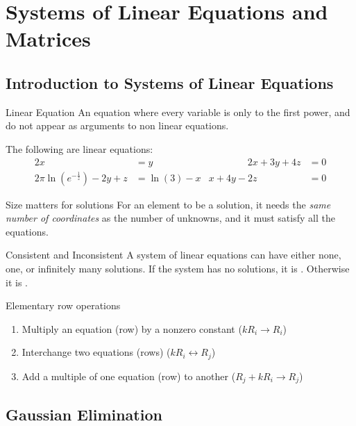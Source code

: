 \documentclass[\main/notes.tex]{subfiles}
\begin{document}
	\chapter[Linear Equations and Matrices]{Systems of Linear Equations and Matrices}
		\section{Introduction to Systems of Linear Equations}
			\begin{definition}{Linear Equation}
				An equation where every variable is only to the first power, and do not appear as arguments to non linear equations.

				\begin{example}
					The following are linear equations:
					\begin{alignat*}{2}
						x &= y & \qquad \qquad 2x + 3y + 4z &= 0\\
						2 \pi \ln \left(e^{-\frac{1}{z}}\right) - 2y + z &= \ln(3) - x & x + 4y - 2z &= 0
					\end{alignat*}
				\end{example}
			\end{definition}
			\begin{sidenote}{Size matters for solutions}
				For an element to be a solution, it needs the \emph{same number of coordinates} as the number of unknowns, and it must satisfy all the equations.
			\end{sidenote}
			\begin{definition}{Consistent and Inconsistent}
				A system of linear equations can have either none, one, or infinitely many solutions. If the system has no solutions, it is . Otherwise it is .
			\end{definition}
			\begin{definition}{Elementary row operations}
				\begin{enumerate}
					\item Multiply an equation (row) by a nonzero constant ($kR_{i} \rightarrow R_{i}$)
					\item Interchange two equations (rows) ($kR_{i} \leftrightarrow R_{j}$)
					\item Add a multiple of one equation (row) to another ($R_{j} + kR_{i} \rightarrow R_{j}$)
				\end{enumerate}
			\end{definition}

		\section{Gaussian Elimination}
\end{document}
